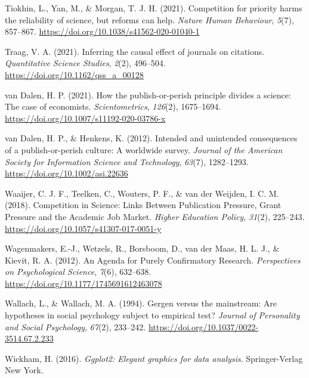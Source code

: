 \documentclass[
  ,man,mask,floatsintext]{apa6}
\newlength{\cslhangindent}
\newlength{\cslentryspacingunit} %
\newenvironment{CSLReferences}[2] %
 {%
  \setlength{\parindent}{0pt}
  \ifodd #1
  \let\oldpar\par
  \def\par{\hangindent=\cslhangindent\oldpar}
  \fi
  \setlength{\parskip}{#2\cslentryspacingunit}
 }%
 {}
\begin{document}
\begin{CSLReferences}{1}{0}
\leavevmode{}%
Tiokhin, L., Yan, M., \& Morgan, T. J. H. (2021). Competition for priority harms the reliability of science, but reforms can help. \emph{Nature Human Behaviour}, \emph{5}(7), 857--867. \url{https://doi.org/10.1038/s41562-020-01040-1}

\leavevmode{}%
Traag, V. A. (2021). Inferring the causal effect of journals on citations. \emph{Quantitative Science Studies}, \emph{2}(2), 496--504. \url{https://doi.org/10.1162/qss_a_00128}

\leavevmode{}%
van Dalen, H. P. (2021). How the publish-or-perish principle divides a science: The case of economists. \emph{Scientometrics}, \emph{126}(2), 1675--1694. \url{https://doi.org/10.1007/s11192-020-03786-x}

\leavevmode{}%
van Dalen, H. P., \& Henkens, K. (2012). Intended and unintended consequences of a publish-or-perish culture: {A} worldwide survey. \emph{Journal of the American Society for Information Science and Technology}, \emph{63}(7), 1282--1293. \url{https://doi.org/10.1002/asi.22636}

\leavevmode{}%
Waaijer, C. J. F., Teelken, C., Wouters, P. F., \& van der Weijden, I. C. M. (2018). Competition in {Science}: {Links Between Publication Pressure}, {Grant Pressure} and the {Academic Job Market}. \emph{Higher Education Policy}, \emph{31}(2), 225--243. \url{https://doi.org/10.1057/s41307-017-0051-y}

\leavevmode{}%
Wagenmakers, E.-J., Wetzels, R., Borsboom, D., van der Maas, H. L. J., \& Kievit, R. A. (2012). An {Agenda} for {Purely Confirmatory Research}. \emph{Perspectives on Psychological Science}, \emph{7}(6), 632--638. \url{https://doi.org/10.1177/1745691612463078}

\leavevmode{}%
Wallach, L., \& Wallach, M. A. (1994). Gergen versus the mainstream: {Are} hypotheses in social psychology subject to empirical test? \emph{Journal of Personality and Social Psychology}, \emph{67}(2), 233--242. \url{https://doi.org/10.1037/0022-3514.67.2.233}

\leavevmode{}%
Wickham, H. (2016). \emph{Ggplot2: {Elegant} graphics for data analysis}. Springer-Verlag New York.


\end{CSLReferences}
\end{document}
